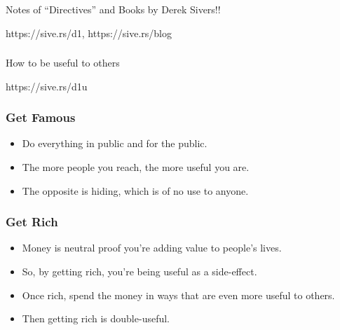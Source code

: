 \begin{frame}[fragile]\frametitle{}
\begin{center}
{\Large Notes of ``Directives'' and Books by Derek Sivers!!}

{\tiny https://sive.rs/d1, https://sive.rs/blog }


\end{center}
\end{frame}

\begin{frame}[fragile]\frametitle{}
\begin{center}
{\Large How to be useful to others}
\end{center}

{\tiny https://sive.rs/d1u}

\end{frame}


\begin{frame}[fragile]\frametitle{Get Famous}

\begin{itemize}
\item Do everything in public and for the public.
\item The more people you reach, the more useful you are.
\item The opposite is hiding, which is of no use to anyone.
\end{itemize}



\end{frame}

\begin{frame}[fragile]\frametitle{Get Rich}

\begin{itemize}
\item Money is neutral proof you’re adding value to people’s lives.
\item So, by getting rich, you’re being useful as a side-effect.
\item Once rich, spend the money in ways that are even more useful to others.
\item Then getting rich is double-useful.
\end{itemize}


\end{frame}

